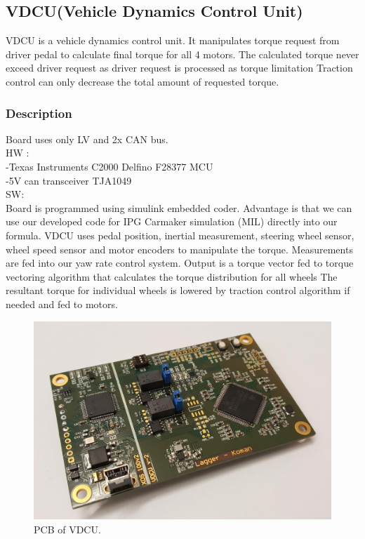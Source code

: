 \subsection{VDCU(Vehicle Dynamics Control Unit)}
VDCU is a vehicle dynamics control unit. It manipulates torque request from driver pedal to calculate final torque for all 4 motors. The calculated torque never exceed driver request as driver request is processed as torque limitation Traction control can only decrease the total amount of requested torque.

\subsubsection{Description}
Board uses only LV and 2x CAN bus.\\
HW :\\
-Texas Instruments C2000 Delfino F28377 MCU\\
-5V can transceiver TJA1049\\

\noindent SW:\\
Board is programmed using simulink embedded coder. Advantage is that we can use our developed code for IPG Carmaker simulation (MIL) directly into our formula. VDCU uses pedal position, inertial measurement, steering wheel sensor, wheel speed sensor and motor encoders to manipulate the torque. Measurements are fed into our yaw rate control system. Output is a torque vector fed to torque vectoring algorithm that calculates the torque distribution for all wheels The resultant torque for individual wheels is lowered by traction control algorithm if needed and fed to motors.

\begin{figure}[H]
	\centering
	\includegraphics[width=\textwidth]{./img/VDCU-pcb.jpg}
	\caption{PCB of VDCU.}
	\label{fig:VDCU-pcb}
\end{figure}

